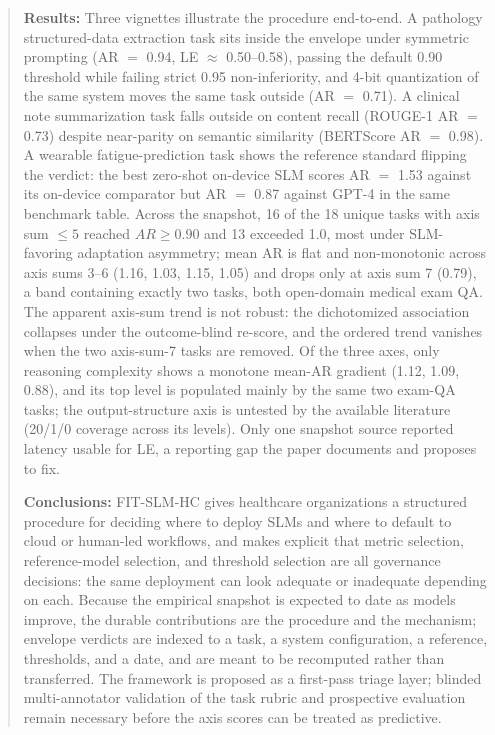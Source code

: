 \documentclass[11pt]{article}
\begin{document}
\begin{abstract}
\textbf{Results:}
Three vignettes illustrate the procedure end-to-end. A pathology structured-data extraction task sits inside the envelope under symmetric prompting (AR $=$ 0.94, LE $\approx$ 0.50--0.58), passing the default 0.90 threshold while failing strict 0.95 non-inferiority, and 4-bit quantization of the same system moves the same task outside (AR $=$ 0.71). A clinical note summarization task falls outside on content recall (ROUGE-1 AR $=$ 0.73) despite near-parity on semantic similarity (BERTScore AR $=$ 0.98). A wearable fatigue-prediction task shows the reference standard flipping the verdict: the best zero-shot on-device SLM scores AR $=$ 1.53 against its on-device comparator but AR $=$ 0.87 against GPT-4 in the same benchmark table. Across the snapshot, 16 of the 18 unique tasks with axis sum $\leq 5$ reached $AR \geq 0.90$ and 13 exceeded 1.0, most under SLM-favoring adaptation asymmetry; mean AR is flat and non-monotonic across axis sums 3--6 (1.16, 1.03, 1.15, 1.05) and drops only at axis sum 7 (0.79), a band containing exactly two tasks, both open-domain medical exam QA. The apparent axis-sum trend is not robust: the dichotomized association collapses under the outcome-blind re-score, and the ordered trend vanishes when the two axis-sum-7 tasks are removed. Of the three axes, only reasoning complexity shows a monotone mean-AR gradient (1.12, 1.09, 0.88), and its top level is populated mainly by the same two exam-QA tasks; the output-structure axis is untested by the available literature (20/1/0 coverage across its levels). Only one snapshot source reported latency usable for LE, a reporting gap the paper documents and proposes to fix.

\textbf{Conclusions:}
FIT-SLM-HC gives healthcare organizations a structured procedure for deciding where to deploy SLMs and where to default to cloud or human-led workflows, and makes explicit that metric selection, reference-model selection, and threshold selection are all governance decisions: the same deployment can look adequate or inadequate depending on each. Because the empirical snapshot is expected to date as models improve, the durable contributions are the procedure and the mechanism; envelope verdicts are indexed to a task, a system configuration, a reference, thresholds, and a date, and are meant to be recomputed rather than transferred. The framework is proposed as a first-pass triage layer; blinded multi-annotator validation of the task rubric and prospective evaluation remain necessary before the axis scores can be treated as predictive.
\end{abstract}
\end{document}
